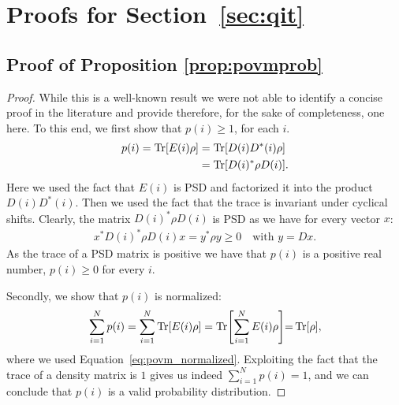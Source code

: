 \maketitle

\section{Proofs for Section~\ref{sec:qit}}


\subsection{Proof of Proposition \ref{prop:povmprob}}
\label{sec:proof:prop:povmprob}


\proppovmprob*

\begin{proof}
	While this is a well-known result we were not able to identify a concise proof in the literature and provide therefore, for the sake of completeness, one here. To this end, we
	first show that $p(i)\geq 1$, for each $i$.
	\begin{align}
		p(i)
		=
		\Tr [ E(i) \rho ]
		 &
		=
		\Tr [ D(i) D^*(i)  \rho ]
		\\
		 &
		=
		\Tr [ D(i)^*  \rho D(i) ]. \nonumber
	\end{align}
	Here we used the fact that $E(i)$ is PSD and factorized it into the product $D(i) D^*(i)$. Then we used the fact that the trace is invariant under cyclical shifts.
	Clearly, the matrix $ D(i)^*  \rho D(i)$ is PSD as we have for every vector $x$:
	\begin{align}
		x^* D(i)^*  \rho D(i) x = y^* \rho y \geq 0 \quad \text{with } y = Dx.
		\label{eq:def:psdPOVM}
	\end{align}
	As the trace of a PSD matrix is positive we have that $p(i)$ is a positive real number, \ie $p(i){\geq} 0$ for every $i$.

	Secondly, we show that $p(i)$ is normalized:
	\begin{align}
		\sum_{i=1}^N p(i)
		=
		\sum_{i=1}^N \Tr [ E(i) \rho ]
		=
		\Tr [ \sum_{i=1}^N E(i) \rho ]
		{=}
		\Tr [  \rho ],
	\end{align}
	where we used Equation~\ref{eq:povm_normalized}.
	Exploiting the fact that the trace of a density matrix is $1$ gives us indeed $\sum_{i=1}^N p(i)=1$, and we can conclude that $p(i)$ is a valid probability distribution.
\end{proof}

